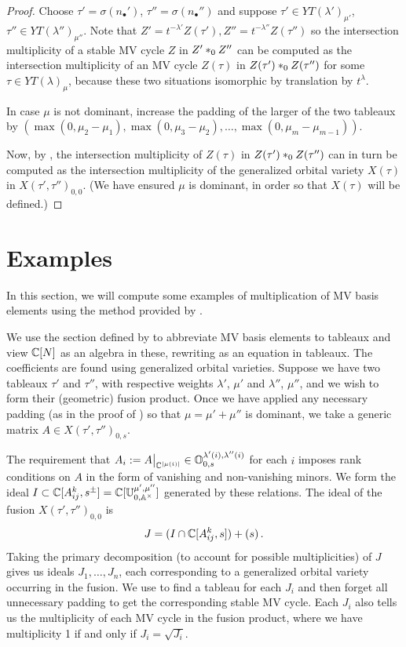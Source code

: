 \documentclass{article}
\begin{document}
\begin{proof}
Choose $\tau' = \sigma(n_\bullet')$, $\tau'' = \sigma(n_\bullet'')$ and suppose $\tau'\in YT(\lambda')_{\mu'}$, $\tau'' \in YT(\lambda'')_{\mu''}$. 
Note that $Z'= t^{-\lambda'}Z(\tau'), Z'' = t^{-\lambda''} Z(\tau'')$ so the intersection multiplicity of a stable MV cycle $Z$ in $Z'\ast_{0} Z''$ can be computed as the intersection multiplicity of an MV cycle $Z(\tau)$ in $Z(\tau')\ast_{0} Z(\tau'')$ for some $\tau\in YT(\lambda)_\mu$, because these two situations isomorphic by translation by $ t^\lambda$. 

In case $\mu$ is not dominant, increase the padding of the larger of the two tableaux by $(\max(0,\mu_2-\mu_1),\max(0,\mu_3 - \mu_2),\dots,\max(0,\mu_m-\mu_{m-1}))$. 

Now, by , the intersection multiplicity of $Z(\tau)$ in $Z(\tau')\ast_{0} Z(\tau'')$ can in turn be computed as the intersection multiplicity of the generalized orbital variety $X(\tau)$ in $X(\tau',\tau'')_{0,0}$.  (We have ensured $ \mu $ is dominant, in order so that $X(\tau)$ will be defined.) 
\end{proof}
% 
\section{Examples}\label{s:examples}

In this section, we will compute some examples of multiplication of MV basis elements using the method provided by .

We use the section defined by  to abbreviate MV basis elements to tableaux and view $\mathbb C[N]$ as an algebra in these, rewriting  as an equation in tableaux.
The coefficients are found using generalized orbital varieties.
Suppose we have two tableaux $\tau'$ and $\tau''$, with respective weights $\lambda'$, $\mu'$ and $\lambda''$, $\mu''$, and we wish to form their (geometric) fusion product. Once we have applied any necessary padding (as in the proof of ) so that $\mu = \mu' + \mu''$ is dominant, we take a generic matrix $A \in X(\tau', \tau'')_{0,s}$.

The requirement that $ A_i := A\big|_{\mathbb C^{|\mu(i)|}} \in \mathbb O^{\lambda'(i), \lambda''(i)}_{0,s}$ for each $i$ imposes rank conditions on $A$ in the form of vanishing and non-vanishing minors. We form the ideal $I\subset \mathbb C[A_{ij}^k, s^\pm] = \mathbb C[\mathbb U_{0, {\mathbb A^\times}}^{\mu', \mu''}]$ generated by these relations. The ideal of the fusion $ X(\tau', \tau'')_{0,0}$ is
% 
$$
    J = (I \cap \mathbb C[A_{ij}^k,s]) + (s)\,.
$$ 
% 
Taking the primary decomposition (to account for possible multiplicities) of $J$ gives us ideals $J_1,\dots,J_n$, each corresponding to a generalized orbital variety occurring in the fusion. We use  to find a tableau for each $J_i$ and then forget all unnecessary padding to get the corresponding stable MV cycle. 
Each $J_i$ also tells us the multiplicity of each MV cycle in the fusion product, where we have multiplicity 1 if and only if $J_i = \sqrt {J_i}$.
\end{document}
